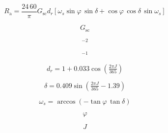 \documentclass[preview,border=2pt]{standalone}
\begin{document}
\[
R_\mathrm{a} = \dfrac{24\,60}{\pi} G_\mathrm{sc} d_r [\omega_s \sin\varphi\,\sin\delta + \cos\varphi\,\cos\delta\,\sin\omega_s]
\]

\[
G_\mathrm{sc}
\]

\[
^{-2}
\]

\[
^{-1}
\]

\[
d_r = 1 + 0.033\cos(\tfrac{2\pi J}{365})
\]

\[
\delta = 0.409\sin(\tfrac{2\pi J}{365} - 1.39)
\]

\[
\omega_s = \arccos(-\tan\varphi\,\tan\delta)
\]

\[
\varphi
\]

\[
J
\]
\end{document}
